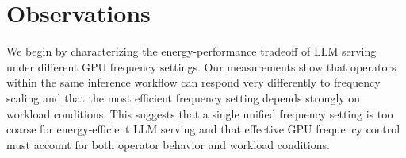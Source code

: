 \section{Observations}
\label{sec:observation}
We begin by characterizing the energy-performance tradeoff of LLM serving under different GPU frequency settings. Our measurements show that operators within the same inference workflow can respond very differently to frequency scaling and that the most efficient frequency setting depends strongly on workload conditions. This suggests that a single unified frequency setting is too coarse for energy-efficient LLM serving and that effective GPU frequency control must account for both operator behavior and workload conditions.

